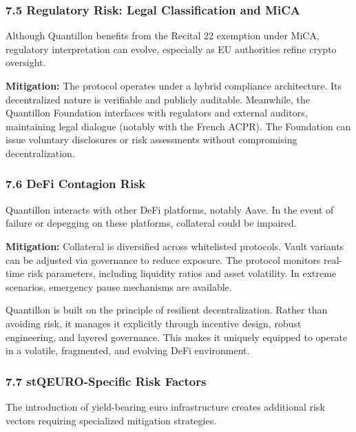 \hypertarget{regulatory-risk-legal-classification-and-mica}{%
\subsubsection{7.5 Regulatory Risk: Legal Classification and
MiCA}\label{regulatory-risk-legal-classification-and-mica}}

Although Quantillon benefits from the Recital 22 exemption under MiCA,
regulatory interpretation can evolve, especially as EU authorities
refine crypto oversight.

\textbf{Mitigation:} The protocol operates under a hybrid compliance
architecture. Its decentralized nature is verifiable and publicly
auditable. Meanwhile, the Quantillon Foundation interfaces with
regulators and external auditors, maintaining legal dialogue (notably
with the French ACPR). The Foundation can issue voluntary disclosures or
risk assessments without compromising decentralization.

\hypertarget{defi-contagion-risk}{%
\subsubsection{7.6 DeFi Contagion Risk}\label{defi-contagion-risk}}

Quantillon interacts with other DeFi platforms, notably Aave. In the
event of failure or depegging on these platforms, collateral could be
impaired.

\textbf{Mitigation:} Collateral is diversified across whitelisted
protocols. Vault variants can be adjusted via governance to reduce
exposure. The protocol monitors real-time risk parameters, including
liquidity ratios and asset volatility. In extreme scenarios, emergency
pause mechanisms are available.

Quantillon is built on the principle of resilient decentralization.
Rather than avoiding risk, it manages it explicitly through incentive
design, robust engineering, and layered governance. This makes it
uniquely equipped to operate in a volatile, fragmented, and evolving
DeFi environment.

\hypertarget{stqeuro-specific-risk-factors}{%
\subsubsection{7.7 stQEURO-Specific Risk
Factors}\label{stqeuro-specific-risk-factors}}

The introduction of yield-bearing euro infrastructure creates additional
risk vectors requiring specialized mitigation strategies.

